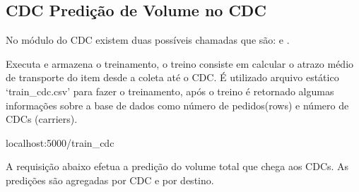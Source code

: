 \documentclass[letterpaper,10pt,english]{sphinxmanual}
\begin{document}
\subsection{CDC \sphinxhyphen{} Predição de Volume no CDC}
\label{\detokenize{examples:cdc-predicao-de-volume-no-cdc}}
\sphinxAtStartPar
No módulo do CDC existem duas possíveis chamadas que são:
 e .

\sphinxAtStartPar
{}

\sphinxAtStartPar
Executa e armazena o treinamento, o treino consiste em calcular
o atrazo médio de transporte do item desde a coleta até o CDC.
É utilizado arquivo estático ‘train\_cdc.csv’ para fazer o treinamento,
após o treino é retornado algumas informações sobre a base de dados
como número de pedidos(rows) e número de CDCs (carriers).

\sphinxAtStartPar
{} localhost:5000/train\_cdc

\sphinxAtStartPar
{}

\begin{sphinxVerbatim}[commandchars=\\\{\}]
     
     
         
         
\end{sphinxVerbatim}

\sphinxAtStartPar
{}

\begin{sphinxVerbatim}[commandchars=\\\{\}]
     
     
\end{sphinxVerbatim}

\sphinxAtStartPar
{}

\sphinxAtStartPar
A requisição abaixo efetua a predição do volume total que
chega aos CDCs. As predições são agregadas por CDC e por
destino.
\end{document}
